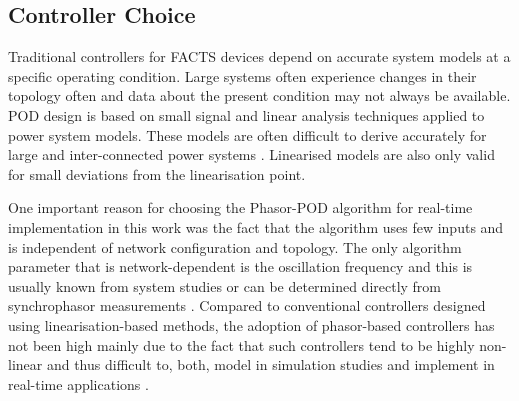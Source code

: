 \documentclass[journal]{IEEEtran}
\begin{document}


\subsection{Controller Choice}  %

Traditional controllers for FACTS devices depend on accurate system models at a specific operating condition. Large systems often experience changes in their topology often and data about the present condition may not always be available. POD design is based on small signal and linear analysis techniques applied to power system models. These models are often difficult to derive accurately for large and inter-connected power systems \cite{WAMTCSC}. Linearised models are also only valid for small deviations from the linearisation point.

One important reason for choosing the Phasor-POD algorithm for real-time implementation in this work was the fact that the algorithm uses few inputs and is independent of network configuration and topology. The only algorithm parameter that is network-dependent is the oscillation frequency and this is usually known from system studies or can be determined directly from synchrophasor measurements \cite{TaskForce}. Compared to conventional controllers designed using linearisation-based methods, the adoption of phasor-based controllers has not been high mainly due to the fact that such controllers tend to be highly non-linear and thus difficult to, both, model in simulation studies \cite{Chaudhuri} and implement in real-time applications \cite{WAPODNorway}.
\end{document}
